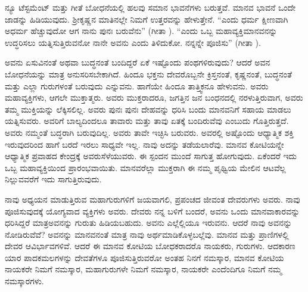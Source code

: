 ನ್ಯೂ ಟೆಸ್ಟಮೆಂಟ್​ ಮತ್ತು ಗೀತೆ ಬೋಧನೆಯಲ್ಲಿ ಹಲವು ಸಮಾನ ಭಾವನೆಗಳು ಬರುತ್ತವೆ. ಮಾನವ ಭಾವನೆ ಒಂದೇ ಜಾಡನ್ನು ಹಿಡಿಯುವುದು. ಶ‍್ರೀಕೃಷ್ಣನ ಮಾತಿನಲ್ಲೇ ನಿಮಗೆ ಉತ್ತರವನ್ನು ಹೇಳುತ್ತೇನೆ. “ಎಂದು ಧರ್ಮ ಕ್ಷೀಣವಾಗಿ ಅಧರ್ಮ ಹೆಚ್ಚುವುದೋ ಆಗ ನಾನು ಪುನಃ ಬರುವೆನು” (ಗೀತಾ ). “ಎಂದು ಒಬ್ಬ ಮಹಾವ್ಯಕ್ತಿ\break ಮಾನವನನ್ನು ಉದ್ಧರಿಸಲು ಯತ್ನಿಸುತ್ತಿರುವನೋ ನಾನೇ ಅವನು ಎಂದು ತಿಳಿದುಕೋ. ನನ್ನನ್ನೇ ಪೂಜಿಸು” (ಗೀತಾ ).

ಅವನು ಏಸುವಿನಂತೆ ಅಥವಾ ಬುದ್ಧನಂತೆ ಬಂದಿದ್ದರೆ ಏಕೆ ಇಷ್ಟೊಂದು ಪಂಥಗಳಿರು\-ವುದು? ಆದರೆ ಅವನ ಬೋಧನೆಯನ್ನು ಮಾತ್ರ ಅನುಸರಿಸಬೇಕಾಗಿದೆ. ಹಿಂದೂ ಭಕ್ತನು ದೇವರೊಬ್ಬನೇ ಕ್ರಿಸ್ತನಂತೆ, ಕೃಷ್ಣನಂತೆ, ಬುದ್ಧನಂತೆ ಮತ್ತು ಎಲ್ಲಾ ಗುರುಗಳಂತೆ ಬರುವುದು ಎನ್ನುವನು. ಹಾಗೆಯೇ ಹಿಂದೂ ತಾತ್ತ್ವಿಕನೂ ಹೇಳುವನು. ಅವರು ಮಹಾವ್ಯಕ್ತಿಗಳು, ಆಗಲೇ ಮುಕ್ತಾತ್ಮರು. ಅವರು ಮುಕ್ತರಾದರೂ, ಜಗತ್ತಿನ ಜನ ಬಂಧನದಲ್ಲಿ ನರಳು\-ತ್ತಿರುವಾಗ, ಅವರು ತಮ್ಮ ಮುಕ್ತಿಯನ್ನು ಲೆಕ್ಕಿಸಲಿಲ್ಲ. ಅವರು ಪುನಃ ಪುನಃ ದೇಹವನ್ನು ಧರಿಸಿ ಬಂದು ಮಾನವನಿಗೆ ಸಹಾಯ ಮಾಡಲು ಯತ್ನಿಸುವರು. ಅವರಿಗೆ ಬಾಲ್ಯದಿಂದಲೂ ತಾವಾರು ಮತ್ತು ತಾವು ಏತಕ್ಕೆ ಬಂದಿರುವೆವು ಎಂಬುದು ಗೊತ್ತಿರುತ್ತದೆ. ಅವರು ನಮ್ಮಂತೆ ಬದ್ಧರಾಗಿ ಬರುವುದಿಲ್ಲ. ಅವರು ತಾವೇ ಇಚ್ಛಿಸಿ ಬರುವರು. ಅವರಲ್ಲಿ ಅಷ್ಟೊಂದು ಆಧ್ಯಾತ್ಮಿಕ ಶಕ್ತಿ ಇರುವುದರಿಂದ ಹಾಗೆ ಬರದೆ ಇರಲು ಸಾಧ್ಯವೇ ಇಲ್ಲ. ನಾವು ಅದನ್ನು ತಡೆಯಲಾರೆವು. ಮಾನವ ಕೋಟಿಯನ್ನೇ ಆಧ್ಯಾತ್ಮಿಕ ಪ್ರವಾಹದ ಕೇಂದ್ರಕ್ಕೆ ಅವರು\break ಸೆಳೆಯುವರು. ಈ ಸ್ಪಂದನ ಮುಂದೆ ಸಾಗುತ್ತ ಹೋಗುವುದು. ಏಕೆಂದರೆ ಇದು ಒಬ್ಬ ಮಹಾವ್ಯಕ್ತಿಯಿಂದ ಪ್ರಾರಂಭವಾಯಿತು. ಮಾನವರೆಲ್ಲಾ ಮುಕ್ತರಾಗಿ ಈ ನಮ್ಮ ಪೃಥ್ವಿಯ ಮೇಲಿನ ಆಟವೆಲ್ಲ ನಿಲ್ಲುವವರೆಗೆ ಇದು ಸಾಗುತ್ತಿರುವುದು.

ನಾವು ಅಧ್ಯಯನ ಮಾಡುತ್ತಿರುವ ಮಹಾಗುರುಗಳಿಗೆ ಜಯವಾಗಲಿ, ಪ್ರಪಂಚದ ಜೀವಂತ ದೇವರುಗಳು ಅವರು. ನಾವು ಪೂಜಿಸುವುದಕ್ಕೆ ಯೋಗ್ಯವಾದ ವ್ಯಕ್ತಿಗಳು ಅವರು. ದೇವರು ನನ್ನ ಬಳಿಗೆ ಬಂದರೆ, ಅವನು ಒಂದು ಮಾನವಾಕಾರವನ್ನು ಧರಿಸಿದ್ದರೆ ಮಾತ್ರ\break ಅವನನ್ನು ಗುರುತು ಹಿಡಿಯಬಹುದು. ಅವನು ಎಲ್ಲೆಲ್ಲಿಯೂ ಇರುವನು. ಆದರೆ ನಾವು ಅವನನ್ನು ನೋಡಿರುವೆವೆ? ಅವನನ್ನು ಮಾನವನಂತೆ ಮಾತ್ರ ನಾವು ಅರ್ಥಮಾಡಿಕೊಳ್ಳಬಲ್ಲೆವು. ಮಾನವ ಮತ್ತು ಪ್ರಾಣಿಗಳಲ್ಲಿ ದೇವರ ಆವಿರ್ಭಾವಗಳಿವೆ. ಆದರೆ ಈ ಮಾನವ ಕೋಟಿಯ ಬೋಧಕರಾದರೊ ನಾಯಕರು, ಗುರುಗಳು. ಆದಕಾರಣ ಯಾರ ಪಾದಕಮಲಗಳನ್ನು ದೇವತೆಗಳೂ ಪೂಜಿಸುತ್ತಿರುವರೋ ಅಂತಹ ನಿನಗೆ ನಮಸ್ಕಾರ, ಮಾನವ ಕೋಟಿಯ ನಾಯಕರೇ ನಿಮಗೆ ನಮಸ್ಕಾರ, ಮಹಾಗುರುಗಳೇ ನಿಮಗೆ ನಮಸ್ಕಾರ, ನಾಯಕರೇ ಎಂದೆಂದಿಗೂ ನಿಮಗೆ ನಮ್ಮ ನಮಸ್ಕಾರಗಳು.

